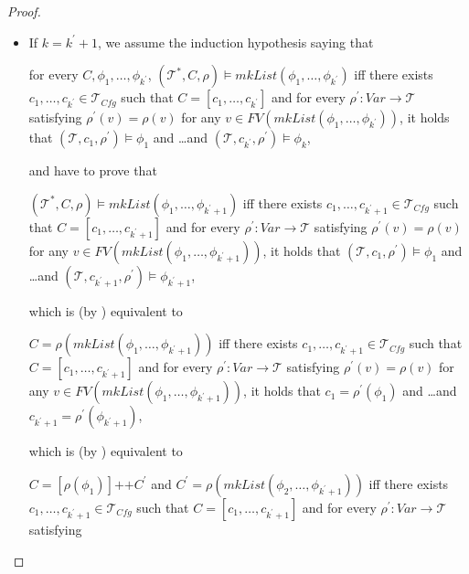 \documentclass{article}
\newcommand{\Tcfg}{\mathcal{T}_{\mathit{Cfg}}}
\newenvironment{proofenv}
  {
    \VerbatimEnvironment\begin{tcolorbox}[colback=black!0!white] %
  }
  {
   \end{tcolorbox}
  }
\begin{document}
\begin{proof}
\begin{itemize}
    \item If $k = k^\prime + 1$, we assume the induction hypothesis saying that
    \begin{proofenv}
    for every $C, \phi_1, \ldots, \phi_{k^\prime}$,
    $(\mathcal{T}^*, C, \rho) \vDash \mathit{mkList}(\phi_1,\ldots,\phi_{k^\prime})$
    iff there exists $c_1, \ldots, c_{k^\prime} \in \Tcfg$ such that $C = [c_1, \ldots, c_{k^\prime}]$
    and for every $\rho^\prime : \mathit{Var} \to \mathcal{T}$ satisfying
    $\rho^\prime(v) = \rho(v)$ for any
    $v \in \mathit{FV}(\mathit{mkList}(\phi_1, \ldots, \phi_{k^\prime}))$,
    it holds that
    $(\mathcal{T}, c_1, \rho^\prime) \vDash \phi_1$ and \ldots and $(\mathcal{T}, c_{k^\prime}, \rho^\prime) \vDash \phi_k$,
    \end{proofenv}
    and have to prove that
    \begin{proofenv}
    $(\mathcal{T}^*, C, \rho) \vDash \mathit{mkList}(\phi_1,\ldots,\phi_{k^\prime + 1})$
    iff there exists $c_1, \ldots, c_{k^\prime + 1} \in \Tcfg$ such that $C = [c_1, \ldots, c_{k^\prime + 1}]$ and 
    for every $\rho^\prime : \mathit{Var} \to \mathcal{T}$ satisfying
    $\rho^\prime(v) = \rho(v)$ for any
    $v \in \mathit{FV}(\mathit{mkList}(\phi_1, \ldots, \phi_{k^\prime + 1}))$,
    it holds that
    $(\mathcal{T}, c_1, \rho^\prime) \vDash \phi_1$ and \ldots and $(\mathcal{T}, c_{k^\prime + 1}, \rho^\prime) \vDash \phi_{k^\prime + 1}$,
    \end{proofenv}
    which is (by ) equivalent to
    \begin{proofenv}
    $C = \rho(\mathit{mkList}(\phi_1,\ldots,\phi_{k^\prime + 1}))$
    iff there exists $c_1, \ldots, c_{k^\prime + 1} \in \Tcfg$ such that $C = [c_1, \ldots, c_{k^\prime + 1}]$
    and for every $\rho^\prime : \mathit{Var} \to \mathcal{T}$ satisfying
    $\rho^\prime(v) = \rho(v)$ for any
    $v \in \mathit{FV}(\mathit{mkList}(\phi_1, \ldots, \phi_{k^\prime + 1}))$,
    it holds that
    $c_1 = \rho^\prime(\phi_1)$ and \ldots and $c_{k^\prime + 1} = \rho^\prime(\phi_{k^\prime + 1})$,
    \end{proofenv}
    which is (by ) equivalent to
    \begin{proofenv}
    $C = [\rho(\phi_1)] \texttt{++} C^\prime$ and $C^\prime = \rho(\mathit{mkList}(\phi_2,\ldots,\phi_{k^\prime + 1}))$
    iff there exists $c_1, \ldots, c_{k^\prime + 1} \in \Tcfg$ such that $C = [c_1, \ldots, c_{k^\prime + 1}]$
    and for every $\rho^\prime : \mathit{Var} \to \mathcal{T}$ satisfying

\end{proofenv}
\end{itemize}
\end{proof}
\end{document}
